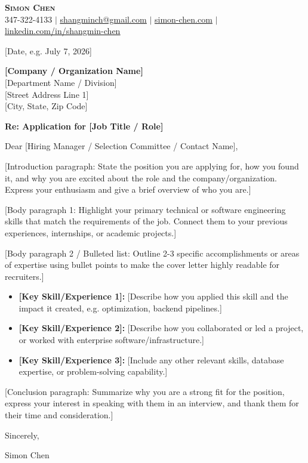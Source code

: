 \documentclass[letterpaper,11pt]{article}
\begin{document}
\begin{center}
    \textbf{\Huge \scshape Simon Chen} \\ \vspace{1pt}
    \small 347-322-4133 $|$ \href{mailto:shangminch@gmail.com}{\underline{shangminch@gmail.com}} $|$ \href{https://simon-chen.com}{\underline{simon-chen.com}} $|$ \href{https://linkedin.com/in/shangmin-chen}{\underline{linkedin.com/in/shangmin-chen}}
\end{center}

\vspace{10pt}

[Date, e.g. July 7, 2026]

\vspace{8pt}
\textbf{{[Company / Organization Name]}} \\
{[Department Name / Division]} \\
{[Street Address Line 1]} \\
{[City, State, Zip Code]}

\vspace{8pt}
\textbf{Re: Application for [Job Title / Role]}

\vspace{8pt}
Dear [Hiring Manager / Selection Committee / Contact Name],

[Introduction paragraph: State the position you are applying for, how you found it, and why you are excited about the role and the company/organization. Express your enthusiasm and give a brief overview of who you are.]

[Body paragraph 1: Highlight your primary technical or software engineering skills that match the requirements of the job. Connect them to your previous experiences, internships, or academic projects.]

[Body paragraph 2 / Bulleted list: Outline 2-3 specific accomplishments or areas of expertise using bullet points to make the cover letter highly readable for recruiters.]
\begin{itemize}[leftmargin=*,noitemsep,topsep=4pt]
    \item \textbf{[Key Skill/Experience 1]:} [Describe how you applied this skill and the impact it created, e.g. optimization, backend pipelines.]
    \item \textbf{[Key Skill/Experience 2]:} [Describe how you collaborated or led a project, or worked with enterprise software/infrastructure.]
    \item \textbf{[Key Skill/Experience 3]:} [Include any other relevant skills, database expertise, or problem-solving capability.]
\end{itemize}

[Conclusion paragraph: Summarize why you are a strong fit for the position, express your interest in speaking with them in an interview, and thank them for their time and consideration.]

\vspace{10pt}
Sincerely,

\vspace{20pt}
Simon Chen
\end{document}
